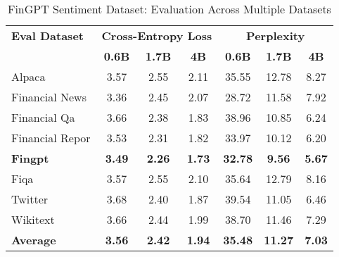 
\begin{table}[h]
\centering
\caption[FinGPT Sentiment: Evaluation Results]{FinGPT Sentiment Dataset: Evaluation Across Multiple Datasets}
\label{tab:fingpt_results}
\begin{tabular}{l|ccc|ccc}
\hline
\textbf{Eval Dataset} & \multicolumn{3}{c|}{\textbf{Cross-Entropy Loss}} & \multicolumn{3}{c}{\textbf{Perplexity}} \\
\cline{2-4} \cline{5-7}
  & \textbf{0.6B} & \textbf{1.7B} & \textbf{4B} & \textbf{0.6B} & \textbf{1.7B} & \textbf{4B} \\
Alpaca & 3.57 & 2.55 & 2.11 & 35.55 & 12.78 & 8.27 \\
Financial News & 3.36 & 2.45 & 2.07 & 28.72 & 11.58 & 7.92 \\
Financial Qa & 3.66 & 2.38 & 1.83 & 38.96 & 10.85 & 6.24 \\
Financial Repor & 3.53 & 2.31 & 1.82 & 33.97 & 10.12 & 6.20 \\
\textbf{Fingpt} & \textbf{3.49} & \textbf{2.26} & \textbf{1.73} & \textbf{32.78} & \textbf{9.56} & \textbf{5.67} \\
Fiqa & 3.57 & 2.55 & 2.10 & 35.64 & 12.79 & 8.16 \\
Twitter & 3.68 & 2.40 & 1.87 & 39.54 & 11.05 & 6.46 \\
Wikitext & 3.66 & 2.44 & 1.99 & 38.70 & 11.46 & 7.29 \\
\hline
\textbf{Average} & \textbf{3.56} & \textbf{2.42} & \textbf{1.94} & \textbf{35.48} & \textbf{11.27} & \textbf{7.03} \\
\hline
\end{tabular}
\end{table}

